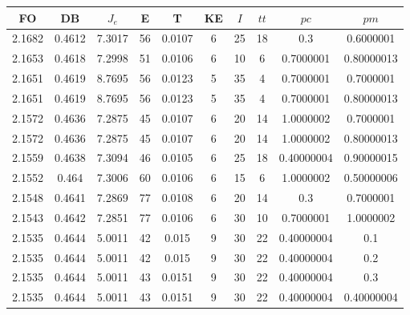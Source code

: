 \begin{table}[h!]
    \footnotesize
    \begin{center}
        \begin{tabular}{|c|c|c|c|c|c|c|c|c|c|}
        \hline
            {\bf FO} & {\bf DB} & $J_e$ & {\bf E} & {\bf T} & {\bf KE} & $I$ & $tt$ & $pc$ & $pm$ \\
        \hline
        \hline
            2.1682 & 0.4612  & 7.3017 & 56 & 0.0107 & 6 & 25 & 18 & 0.3 & 0.6000001\\
        \hline
        \hline
            2.1653 & 0.4618  & 7.2998 & 51 & 0.0106 & 6 & 10 & 6 & 0.7000001 & 0.80000013\\
        \hline
        \hline
            2.1651 & 0.4619  & 8.7695 & 56 & 0.0123 & 5 & 35 & 4 & 0.7000001 & 0.7000001\\
        \hline
        \hline
            2.1651 & 0.4619  & 8.7695 & 56 & 0.0123 & 5 & 35 & 4 & 0.7000001 & 0.80000013\\
        \hline
        \hline
            2.1572 & 0.4636  & 7.2875 & 45 & 0.0107 & 6 & 20 & 14 & 1.0000002 & 0.7000001\\
        \hline
        \hline
            2.1572 & 0.4636  & 7.2875 & 45 & 0.0107 & 6 & 20 & 14 & 1.0000002 & 0.80000013\\
        \hline
        \hline
            2.1559 & 0.4638  & 7.3094 & 46 & 0.0105 & 6 & 25 & 18 & 0.40000004 & 0.90000015\\
        \hline
        \hline
            2.1552 & 0.464  & 7.3006 & 60 & 0.0106 & 6 & 15 & 6 & 1.0000002 & 0.50000006\\
        \hline
        \hline
            2.1548 & 0.4641  & 7.2869 & 77 & 0.0108 & 6 & 20 & 14 & 0.3 & 0.7000001\\
        \hline
        \hline
            2.1543 & 0.4642  & 7.2851 & 77 & 0.0106 & 6 & 30 & 10 & 0.7000001 & 1.0000002\\
        \hline
        \hline
            2.1535 & 0.4644  & 5.0011 & 42 & 0.015 & 9 & 30 & 22 & 0.40000004 & 0.1\\
        \hline
        \hline
            2.1535 & 0.4644  & 5.0011 & 42 & 0.015 & 9 & 30 & 22 & 0.40000004 & 0.2\\
        \hline
        \hline
            2.1535 & 0.4644  & 5.0011 & 43 & 0.0151 & 9 & 30 & 22 & 0.40000004 & 0.3\\
        \hline
        \hline
            2.1535 & 0.4644  & 5.0011 & 43 & 0.0151 & 9 & 30 & 22 & 0.40000004 & 0.40000004\\

\end{tabular}
\end{center}
\end{table}
